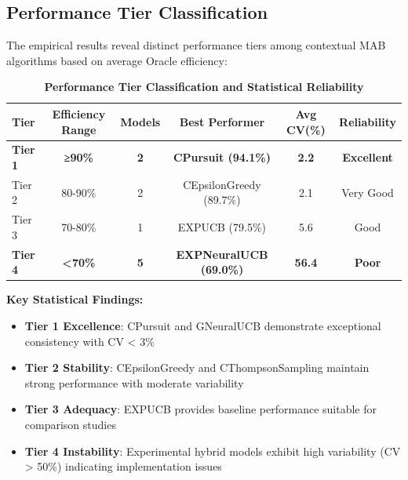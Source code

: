 \documentclass[12pt,a4paper]{article}
\newcommand{\stochastic}[1]{\textcolor{stochasticcolor}{\textbf{#1}}}
\newcommand{\critical}[1]{\textcolor{criticalcolor}{\textbf{#1}}}
\begin{document}
\begin{tcolorbox}[colback=stochasticcolor!10,colframe=stochasticcolor,title=\textbf{Statistical Reliability and Performance Tier Analysis}]

\subsection{Performance Tier Classification}

The empirical results reveal distinct performance tiers among contextual MAB algorithms based on average Oracle efficiency:

\begin{table}[H]
\centering
\caption{\stochastic{Performance Tier Classification and Statistical Reliability}}
\begin{tabular}{|l|c|c|c|c|c|}
\hline
\textbf{Tier} & \textbf{Efficiency Range} & \textbf{Models} & \textbf{Best Performer} & \textbf{Avg CV(\%)} & \textbf{Reliability} \\
\hline
\hline
\stochastic{Tier 1} & \stochastic{≥90\%} & \stochastic{2} & \stochastic{CPursuit (94.1\%)} & \stochastic{2.2} & \stochastic{Excellent} \\
Tier 2 & 80-90\% & 2 & CEpsilonGreedy (89.7\%) & 2.1 & Very Good \\
Tier 3 & 70-80\% & 1 & EXPUCB (79.5\%) & 5.6 & Good \\
\critical{Tier 4} & \critical{<70\%} & \critical{5} & \critical{EXPNeuralUCB (69.0\%)} & \critical{56.4} & \critical{Poor} \\
\hline
\end{tabular}
\end{table}

\textbf{Key Statistical Findings:}
\begin{itemize}
\item \stochastic{Tier 1 Excellence}: CPursuit and GNeuralUCB demonstrate exceptional consistency with CV < 3\%
\item \stochastic{Tier 2 Stability}: CEpsilonGreedy and CThompsonSampling maintain strong performance with moderate variability
\item \stochastic{Tier 3 Adequacy}: EXPUCB provides baseline performance suitable for comparison studies
\item \critical{Tier 4 Instability}: Experimental hybrid models exhibit high variability (CV > 50\%) indicating implementation issues
\end{itemize}

\end{tcolorbox}
\end{document}

